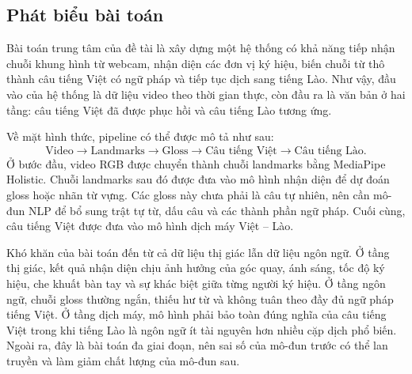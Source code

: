 ﻿\subsection{Phát biểu bài toán}

Bài toán trung tâm của đề tài là xây dựng một hệ thống có khả năng tiếp nhận chuỗi khung hình từ webcam, nhận diện các đơn vị ký hiệu, biến chuỗi từ thô thành câu tiếng Việt có ngữ pháp và tiếp tục dịch sang tiếng Lào. Như vậy, đầu vào của hệ thống là dữ liệu video theo thời gian thực, còn đầu ra là văn bản ở hai tầng: câu tiếng Việt đã được phục hồi và câu tiếng Lào tương ứng.

Về mặt hình thức, pipeline có thể được mô tả như sau:
\[
\text{Video} \rightarrow \text{Landmarks} \rightarrow \text{Gloss} \rightarrow \text{Câu tiếng Việt} \rightarrow \text{Câu tiếng Lào}.
\]
Ở bước đầu, video RGB được chuyển thành chuỗi landmarks bằng MediaPipe Holistic. Chuỗi landmarks sau đó được đưa vào mô hình nhận diện để dự đoán gloss hoặc nhãn từ vựng. Các gloss này chưa phải là câu tự nhiên, nên cần mô-đun NLP để bổ sung trật tự từ, dấu câu và các thành phần ngữ pháp. Cuối cùng, câu tiếng Việt được đưa vào mô hình dịch máy Việt -- Lào.

Khó khăn của bài toán đến từ cả dữ liệu thị giác lẫn dữ liệu ngôn ngữ. Ở tầng thị giác, kết quả nhận diện chịu ảnh hưởng của góc quay, ánh sáng, tốc độ ký hiệu, che khuất bàn tay và sự khác biệt giữa từng người ký hiệu. Ở tầng ngôn ngữ, chuỗi gloss thường ngắn, thiếu hư từ và không tuân theo đầy đủ ngữ pháp tiếng Việt. Ở tầng dịch máy, mô hình phải bảo toàn đúng nghĩa của câu tiếng Việt trong khi tiếng Lào là ngôn ngữ ít tài nguyên hơn nhiều cặp dịch phổ biến. Ngoài ra, đây là bài toán đa giai đoạn, nên sai số của mô-đun trước có thể lan truyền và làm giảm chất lượng của mô-đun sau.

